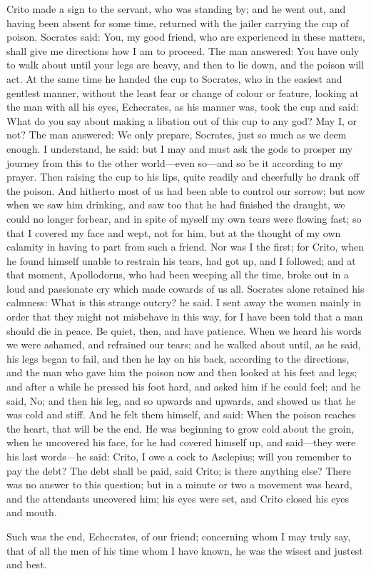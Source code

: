 \documentclass[11pt,letter]{article}
\begin{document}
\par  Crito made a sign to the servant, who was standing by; and he went out, and having been absent for some time, returned with the jailer carrying the cup of poison. Socrates said: You, my good friend, who are experienced in these matters, shall give me directions how I am to proceed. The man answered: You have only to walk about until your legs are heavy, and then to lie down, and the poison will act. At the same time he handed the cup to Socrates, who in the easiest and gentlest manner, without the least fear or change of colour or feature, looking at the man with all his eyes, Echecrates, as his manner was, took the cup and said: What do you say about making a libation out of this cup to any god? May I, or not? The man answered: We only prepare, Socrates, just so much as we deem enough. I understand, he said: but I may and must ask the gods to prosper my journey from this to the other world—even so—and so be it according to my prayer. Then raising the cup to his lips, quite readily and cheerfully he drank off the poison. And hitherto most of us had been able to control our sorrow; but now when we saw him drinking, and saw too that he had finished the draught, we could no longer forbear, and in spite of myself my own tears were flowing fast; so that I covered my face and wept, not for him, but at the thought of my own calamity in having to part from such a friend. Nor was I the first; for Crito, when he found himself unable to restrain his tears, had got up, and I followed; and at that moment, Apollodorus, who had been weeping all the time, broke out in a loud and passionate cry which made cowards of us all. Socrates alone retained his calmness: What is this strange outcry? he said. I sent away the women mainly in order that they might not misbehave in this way, for I have been told that a man should die in peace. Be quiet, then, and have patience. When we heard his words we were ashamed, and refrained our tears; and he walked about until, as he said, his legs began to fail, and then he lay on his back, according to the directions, and the man who gave him the poison now and then looked at his feet and legs; and after a while he pressed his foot hard, and asked him if he could feel; and he said, No; and then his leg, and so upwards and upwards, and showed us that he was cold and stiff. And he felt them himself, and said: When the poison reaches the heart, that will be the end. He was beginning to grow cold about the groin, when he uncovered his face, for he had covered himself up, and said—they were his last words—he said: Crito, I owe a cock to Asclepius; will you remember to pay the debt? The debt shall be paid, said Crito; is there anything else? There was no answer to this question; but in a minute or two a movement was heard, and the attendants uncovered him; his eyes were set, and Crito closed his eyes and mouth.

\par  Such was the end, Echecrates, of our friend; concerning whom I may truly say, that of all the men of his time whom I have known, he was the wisest and justest and best.

\par 
 
\end{document}
